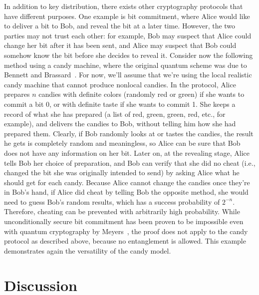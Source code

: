 \documentclass{article}
\begin{document}
In addition to key distribution, there exists other cryptography protocols that have different purposes.
One example is bit commitment, where Alice would like to deliver a bit to Bob, and reveal the bit at a later time.
However, the two parties may not trust each other: for example, Bob may suspect that Alice could change her bit after it has been sent, and Alice may suspect that Bob could somehow know the bit before she decides to reveal it.
Consider now the following method using a candy machine, where the original quantum scheme was due to Bennett and Brassard~\cite{bennett1984quantum}. 
For now, we'll assume that we're using the local realistic candy machine that cannot produce nonlocal candies.
In the protocol, Alice prepares $n$ candies with definite colors (randomly red or green) if she wants to commit a bit 0, or with definite taste if she wants to commit 1.
She keeps a record of what she has prepared (a list of red, green, green, red, etc., for example), and delivers the candies to Bob, without telling him how she had prepared them.
Clearly, if Bob randomly looks at or tastes the candies, the result he gets is completely random and meaningless, so Alice can be sure that Bob does not have any information on her bit.
Later on, at the revealing stage, Alice tells Bob her choice of preparation, and Bob can verify that she did no cheat (i.e., changed the bit she was originally intended to send) by asking Alice what he should get for each candy.
Because Alice cannot change the candies once they're in Bob's hand, if Alice did cheat by telling Bob the opposite method, she would need to guess Bob's random results, which has a success probability of $2^{-n}$.
Therefore, cheating can be prevented with arbitrarily high probability.
While unconditionally secure bit commitment has been proven to be impossible even with quantum cryptography by Meyers~\cite{mayers1997unconditionally}, the proof does not apply to the candy protocol as described above, because no entanglement is allowed.
This example demonstrates again the versatility of the candy model.

\section{Discussion}\label{discussion section}
\end{document}
